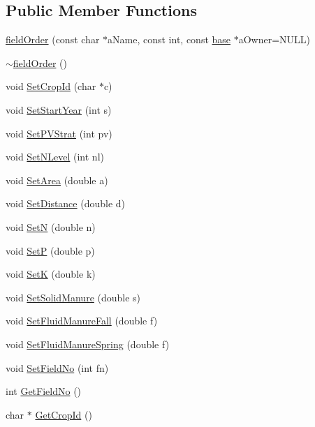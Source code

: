 \subsection*{Public Member Functions}
\begin{DoxyCompactItemize}
\item 
\hyperlink{classfield_order_ae6d0b710f8f80d249e487335937cd3d7}{fieldOrder} (const char $\ast$aName, const int, const \hyperlink{classbase}{base} $\ast$aOwner=NULL)
\item 
\hyperlink{classfield_order_a0ec46bad257b1812160bcb4e964a3b31}{$\sim$fieldOrder} ()
\item 
void \hyperlink{classfield_order_a9450351fd1d3017621193440f2899f10}{SetCropId} (char $\ast$c)
\item 
void \hyperlink{classfield_order_a643622d18b25f4a4798562411ed14211}{SetStartYear} (int s)
\item 
void \hyperlink{classfield_order_a64e26e4382b5e84dde4e24ad0c56e3cc}{SetPVStrat} (int pv)
\item 
void \hyperlink{classfield_order_a136008fdfe58b9aa8964bab673cc673c}{SetNLevel} (int nl)
\item 
void \hyperlink{classfield_order_ac689fa9a09d2e97c63dd7d0d04039c73}{SetArea} (double a)
\item 
void \hyperlink{classfield_order_ae9dfee3dc8f17fbaa56c430927be070d}{SetDistance} (double d)
\item 
void \hyperlink{classfield_order_a88943af80816ed879533b2cc5dbc3f2b}{SetN} (double n)
\item 
void \hyperlink{classfield_order_a68f6947497207ded7cbc7720acfbdade}{SetP} (double p)
\item 
void \hyperlink{classfield_order_ad1b2b349916029c18cd68279cf273786}{SetK} (double k)
\item 
void \hyperlink{classfield_order_af0edd102b669c807dbbe5b30373d9a84}{SetSolidManure} (double s)
\item 
void \hyperlink{classfield_order_a9ff8f81240fb283b238681dcd3514007}{SetFluidManureFall} (double f)
\item 
void \hyperlink{classfield_order_ab19123bbac2dd1c1f4723371f97a37a0}{SetFluidManureSpring} (double f)
\item 
void \hyperlink{classfield_order_aeae74fa4ff075f9f86e11a6601e1f1ec}{SetFieldNo} (int fn)
\item 
int \hyperlink{classfield_order_aa6529313f9f7162809514adcb1b178e8}{GetFieldNo} ()
\item 
char $\ast$ \hyperlink{classfield_order_a9cf0299ebb246ebe453078771d67a3a7}{GetCropId} ()

\end{DoxyCompactItemize}
